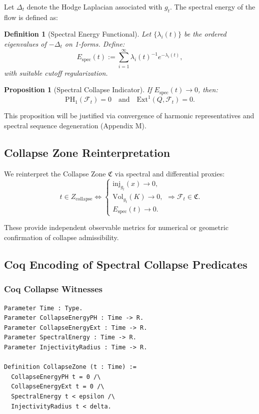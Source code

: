 \documentclass[11pt]{article}
\newtheorem{definition}[theorem]{Definition}
\newtheorem{proposition}[theorem]{Proposition}
\begin{document}
Let \( \Delta_t \) denote the Hodge Laplacian associated with \( g_t \). The spectral energy of the flow is defined as:

\begin{definition}[Spectral Energy Functional]
Let \( \{ \lambda_i(t) \} \) be the ordered eigenvalues of \( -\Delta_t \) on 1-forms. Define:
\begin{equation}
E_{\mathrm{spec}}(t) := \sum_{i=1}^\infty \lambda_i(t)^{-1} e^{-\lambda_i(t)},
\end{equation}
with suitable cutoff regularization.
\end{definition}

\begin{proposition}[Spectral Collapse Indicator]
If \( E_{\mathrm{spec}}(t) \to 0 \), then:
\[
\mathrm{PH}_1(\mathcal{F}_t) = 0 \quad \text{and} \quad \mathrm{Ext}^1(Q, \mathcal{F}_t) = 0.
\]
\end{proposition}

This proposition will be justified via convergence of harmonic representatives and spectral sequence degeneration (Appendix M).

\subsection{Collapse Zone Reinterpretation}

We reinterpret the Collapse Zone \( \mathfrak{C} \) via spectral and differential proxies:
\[
t \in Z_{\mathrm{collapse}} \iff
\begin{cases}
\mathrm{inj}_{g_t}(x) \to 0, \\
\mathrm{Vol}_{g_t}(K) \to 0, \\
E_{\mathrm{spec}}(t) \to 0.
\end{cases}
\Rightarrow \mathcal{F}_t \in \mathfrak{C}.
\]

These provide independent observable metrics for numerical or geometric confirmation of collapse admissibility.

\subsection{Coq Encoding of Spectral Collapse Predicates}

\subsubsection*{Coq Collapse Witnesses}
\begin{lstlisting}
Parameter Time : Type.
Parameter CollapseEnergyPH : Time -> R.
Parameter CollapseEnergyExt : Time -> R.
Parameter SpectralEnergy : Time -> R.
Parameter InjectivityRadius : Time -> R.

Definition CollapseZone (t : Time) :=
  CollapseEnergyPH t = 0 /\
  CollapseEnergyExt t = 0 /\
  SpectralEnergy t < epsilon /\
  InjectivityRadius t < delta.
\end{lstlisting}
\end{document}
